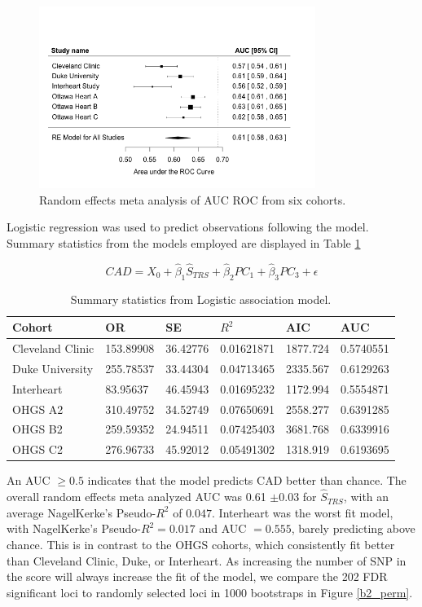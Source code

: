 \begin{figure}[h]
\label{trs_meta}
\caption{Random effects meta analysis of AUC ROC from six cohorts.}
\centering
\includegraphics[width=0.8\textwidth]{Figures/trs_meta.png}
\end{figure}

Logistic regression was used to predict observations following the model. Summary statistics from the models employed are displayed in Table \ref{trs}

$$ CAD = X_0 + \hat{\beta}_1 \hat{S}_{TRS} + \hat{\beta}_2 PC_1 + \hat{\beta}_3 PC_3 + \epsilon $$

\begin{table}[H]
\centering
\caption{Summary statistics from Logistic association model. }
\label{trs}
\begin{tabular}{llllll}
\hline
Cohort           & OR        & SE       & $R^2$      & AIC      & AUC       \\ \hline
Cleveland Clinic & 153.89908 & 36.42776 & 0.01621871 & 1877.724 & 0.5740551 \\
Duke University  & 255.78537 & 33.44304 & 0.04713465 & 2335.567 & 0.6129263 \\
Interheart       & 83.95637  & 46.45943 & 0.01695232 & 1172.994 & 0.5554871 \\
OHGS A2          & 310.49752 & 34.52749 & 0.07650691 & 2558.277 & 0.6391285 \\
OHGS B2          & 259.59352 & 24.94511 & 0.07425403 & 3681.768 & 0.6339916 \\
OHGS C2          & 276.96733 & 45.92012 & 0.05491302 & 1318.919 & 0.6193695 \\ \hline
\end{tabular}
\end{table}

An \ac{AUC} $\geq 0.5$ indicates that the model predicts CAD better than chance. The overall random effects meta analyzed \ac{AUC} was 0.61 $\pm 0.03$ for $\hat{S}_{TRS}$, with an average NagelKerke's Pseudo-$R^2$ of $0.047$. Interheart was the worst fit model, with NagelKerke's Pseudo-$R^2 = 0.017$ and \ac{AUC} $= 0.555$, barely predicting above chance. This is in contrast to the OHGS cohorts, which consistently fit better than Cleveland Clinic, Duke, or Interheart. As increasing the number of \acs{SNP} in the score will always increase the fit of the model, we compare the 202 FDR significant loci to randomly selected loci in 1000 bootstraps in Figure \ref{b2_perm}. 


